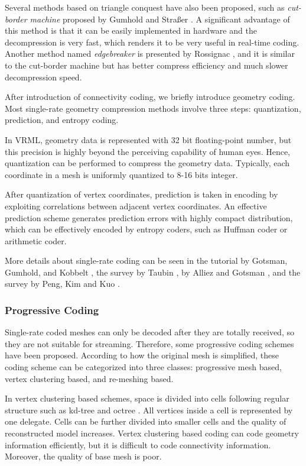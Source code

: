 \documentclass[11pt, a4paper]{report}
\begin{document}
    Several methods based on triangle conquest have also been
    proposed, such as \emph{cut-border machine} proposed by 
    Gumhold and Stra\ss{}er \cite{280836}.
    A significant advantage of this method is that it can be easily implemented
    in hardware and the decompression is very fast, which
    renders it to be very useful in real-time coding. 
    Another method named \emph{edgebreaker} is presented by Rossignac \cite{614421},
    and it is similar to the cut-border machine but has better
    compress efficiency and much slower decompression speed.
    
    After introduction of connectivity coding, we briefly introduce geometry
    coding. Most single-rate geometry compression methods involve three steps:
    quantization, prediction, and entropy coding.

    In VRML, geometry data is represented with 32 bit floating-point
    number, but this precision is highly beyond the perceiving
    capability of human eyes. Hence, quantization can be performed to
    compress the geometry data. Typically, each coordinate in a mesh is
    uniformly quantized to 8-16 bits integer.

    After quantization of vertex coordinates, prediction is taken in
    encoding by exploiting correlations between adjacent vertex
    coordinates. An effective prediction scheme generates prediction
    errors with highly compact distribution, which can be effectively
    encoded by entropy coders, such as Huffman coder or arithmetic
    coder. 

    More details about single-rate coding can be seen in the tutorial
    by Gotsman, Gumhold, and Kobbelt \cite{gotsman-simplification},
    the survey by Taubin \cite{3d:Taubin}, by Alliez and Gotsman
    \cite{recent:alliez}, and the survey by Peng, Kim and Kuo
    \cite{technologies:peng}.
    
    \subsubsection{Progressive Coding}
    Single-rate coded meshes can only be decoded after they are
    totally received, so they are not suitable for streaming. Therefore,
    some progressive coding schemes have been proposed. According to
    how the original mesh is simplified, these coding scheme can be
    categorized into three classes: progressive mesh based, vertex
    clustering based, and re-meshing based.

    In vertex clustering based schemes, space is divided into cells
    following regular structure such as kd-tree \cite{566591} and 
    octree \cite{1073237}. All vertices inside a cell is represented
    by one delegate. Cells can be further divided into smaller cells
    and the quality of reconstructed model increases. Vertex clustering
    based coding can code geometry information efficiently, but it is 
    difficult to code connectivity information. Moreover, the quality
    of base mesh is poor.
\end{document}
